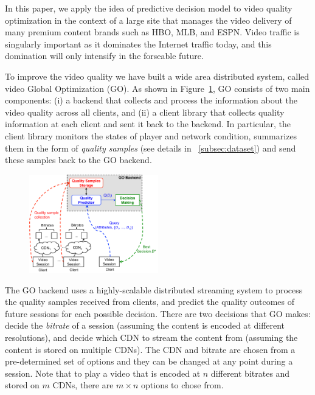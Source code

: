 In this paper, we apply the idea of predictive decision model to video
quality optimization in the context of a large site that manages the
video delivery of many premium content brands such as HBO, MLB, and
ESPN. Video traffic is singularly important as it dominates the
Internet traffic today, and this domination will only intensify in the
forseable future.



To improve the video quality we have built a wide area distributed
system, called video Global Optimization (GO).  As shown in
Figure~\ref{fig:go-overview}, GO consists of two main components: (i)
a backend that collects and process the information about the video
quality across all clients, and (ii) a client library that collects
quality information at each client and sent it back to the backend. In
particular, the client library monitors the states of player and
network condition, summarizes them in the form of \emph{quality
  samples} (see details in \Section~\ref{subsec:dataset}) and send
these samples back to the GO backend.

\begin{figure}[h!]
\centering
 \includegraphics[width=0.5\textwidth] {figures/go-overview.pdf}
\label{fig:go-overview}
\end{figure}
 
The GO backend uses a highly-scalable distributed streaming system to
process the quality samples received from clients, and predict the
quality outcomes of future sessions for each possible decision. There
are two decisions that GO makes: decide the {\it bitrate} of a session
(assuming the content is encoded at different resolutions), and decide
which CDN to stream the content from (assuming the content is stored
on multiple CDNs). The CDN and bitrate are chosen from a
pre-determined set of options and they can be changed at any point
during a session. Note that to play a video that is encoded at $n$
different bitrates and stored on $m$ CDNs, there are $m\times n$
options to chose from.  

